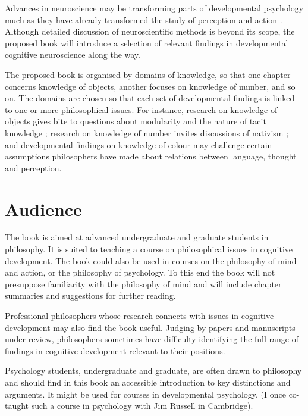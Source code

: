 \documentclass[12pt,\papersize]{extarticle}
\begin{document}
Advances in neuroscience may be transforming parts of developmental psychology much as they have already transformed the study of perception and action \citep{Johnson:2005az}. 
Although detailed discussion of neuroscientific methods is beyond its scope, the proposed book will introduce a selection of relevant findings in developmental cognitive neuroscience along the way. 

The proposed book is organised by domains of knowledge, so that one chapter concerns knowledge of objects, another focuses on  knowledge of number, and so on.  
The domains are chosen so that each set of developmental findings is linked to one or more philosophical issues. 
For instance, research on knowledge of objects gives bite to questions about modularity and the nature of tacit knowledge%
; research on knowledge of number invites discussions of nativism%
; and developmental findings on knowledge of colour may challenge certain assumptions philosophers have made about relations between language, thought and perception.  





\section{Audience}

The book is aimed at advanced undergraduate and graduate students in philosophy. 
It is suited to teaching a course on philosophical issues in cognitive development. 
The book could also be used in courses on the philosophy of mind and action, or the philosophy of psychology. 
To this end the book will not presuppose familiarity with the philosophy of mind and will include chapter summaries and suggestions for further reading.

Professional philosophers whose research connects with issues in cognitive development may also find the book useful.  
Judging by papers and manuscripts under review, philosophers sometimes have difficulty identifying the full range of findings in cognitive development relevant to their positions.  

Psychology students, undergraduate and graduate, are often drawn to philosophy and should find in this book an accessible introduction to key distinctions and arguments. 
It might  be used for courses in developmental psychology. (I once co-taught such a course in psychology with Jim Russell in Cambridge).
\end{document}
